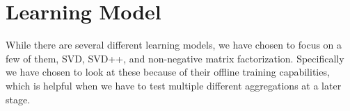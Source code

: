 \section{Learning Model}
While there are several different learning models, we have chosen to focus on a few of them, SVD, SVD++, and non-negative matrix factorization. Specifically we have chosen to look at these because of their offline training capabilities, which is helpful when we have to test multiple different aggregations at a later stage.
%
%



